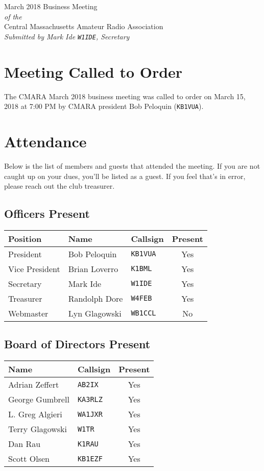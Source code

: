 \documentclass[10pt,letterpaper]{article}
\begin{document}
\begin{center}
{\huge March 2018 Business Meeting}\\
\emph{of the}\\
{\Large Central Massachusetts Amateur Radio Association}\\
\emph{Submitted by Mark Ide \texttt{W1IDE}, Secretary}
\end{center}

\section{Meeting Called to Order}
The CMARA March 2018 business meeting was called to order on March 15, 2018 at 7:00 PM by CMARA president Bob Peloquin (\texttt{KB1VUA}).

\section{Attendance}
\noindent
Below is the list of members and guests that attended the meeting. If you are not caught up on your dues, you'll be listed as a guest. If you feel that's in error, please reach out the club treasurer.

\subsection{Officers Present}
\begin{tabular}{|l|l|l|c|}
  \hline
  \textbf{Position} & \textbf{Name}  & \textbf{Callsign} & \textbf{Present} \\ \hline
  President         & Bob Peloquin   & \texttt{KB1VUA}   & Yes \\
  Vice President    & Brian Loverro  & \texttt{K1BML}    & Yes \\
  Secretary         & Mark Ide       & \texttt{W1IDE}    & Yes \\
  Treasurer         & Randolph Dore  & \texttt{W4FEB}    & Yes \\
  Webmaster         & Lyn Glagowski  & \texttt{WB1CCL}   & No  \\
  \hline
\end{tabular}

\subsection{Board of Directors Present}
\begin{tabular}{|l|l|c|}
  \hline
  \textbf{Name}     & \textbf{Callsign} & \textbf{Present} \\ \hline
  Adrian Zeffert  & \texttt{AB2IX}    & Yes \\
  George Gumbrell & \texttt{KA3RLZ}   & Yes \\
  L. Greg Algieri & \texttt{WA1JXR}   & Yes \\
  Terry Glagowski & \texttt{W1TR}     & Yes \\
  Dan Rau         & \texttt{K1RAU}    & Yes \\
  Scott Olsen     & \texttt{KB1EZF}   & Yes \\
  \hline
\end{tabular}
\end{document}
